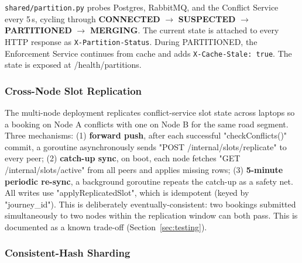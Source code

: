 \documentclass[11pt,a4paper]{article}
\begin{document}
\texttt{shared/partition.py} probes Postgres, RabbitMQ, and the Conflict Service every 5\,s, cycling through \textbf{CONNECTED} $\to$ \textbf{SUSPECTED} $\to$ \textbf{PARTITIONED} $\to$ \textbf{MERGING}. The current state is attached to every HTTP response as \texttt{X-Partition-Status}. During PARTITIONED, the Enforcement Service continues from cache and adds \texttt{X-Cache-Stale: true}. The state is exposed at /health/partitions.

\subsubsection{Cross-Node Slot Replication}
\label{sec:replication}

The multi-node deployment replicates conflict-service slot state across laptops so a booking on Node A conflicts with one on Node B for the same road segment. Three mechanisms: (1) \textbf{forward push}, after each successful "checkConflicts()" commit, a goroutine asynchronously sends "POST /internal/slots/replicate" to every peer; (2) \textbf{catch-up sync}, on boot, each node fetches "GET /internal/slots/active" from all peers and applies missing rows; (3) \textbf{5-minute periodic re-sync}, a background goroutine repeats the catch-up as a safety net. All writes use "applyReplicatedSlot", which is idempotent (keyed by "journey\_id"). This is deliberately eventually-consistent: two bookings submitted simultaneously to two nodes within the replication window can both pass. This is documented as a known trade-off (Section~\ref{sec:testing}).

\subsubsection{Consistent-Hash Sharding}
\end{document}
